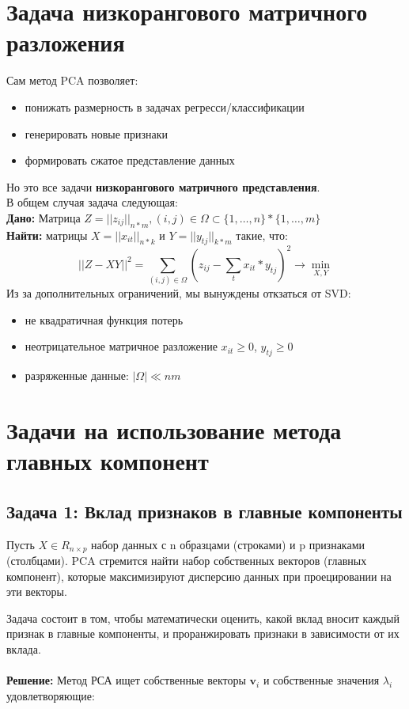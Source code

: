 \section{Задача низкорангового матричного разложения}
Сам метод PCA позволяет:
\begin{itemize}
    \item понижать размерность в задачах регресси/классификации
    \item генерировать новые признаки 
    \item формировать сжатое представление данных
\end{itemize}
Но это все задачи \textbf{низкорангового матричного представления}. \\
В общем случая задача следующая: \\
\textbf{Дано:} Матрица $Z = ||z_{ij}||_{n*m}, (i, j) \in \Omega \subset \{1, \dots, n\}*\{1, \dots, m\}$  \\ 
\textbf{Найти:} матрицы $X=||x_{it}||_{n*k}$ и $Y = ||y_{tj}||_{k*m}$ такие, что:  
$$
||Z-XY||^{2} = \sum_{(i,j) \in \Omega} (z_{ij} - \sum_t x_{it}*y_{tj})^2 \rightarrow \min_{X, Y}
$$
Из за дополнительных ограничений, мы вынуждены откзаться от SVD:
\begin{itemize}
    \item не квадратичная функция потерь
    \item неотрицательное матричное разложение $x_{it} \geq 0$, $y_{tj} \geq 0$
    \item разряженные данные: $|\Omega| \ll nm$
\end{itemize}

\section{Задачи на использование метода главных компонент}

\subsection{Задача 1: Вклад признаков в главные компоненты}
Пусть $X \in R_{n\times p}$ набор данных с n образцами (строками) и p признаками (столбцами). PCA стремится найти набор собственных векторов (главных компонент), которые максимизируют дисперсию данных при проецировании на эти векторы.

Задача состоит в том, чтобы математически оценить, какой вклад вносит каждый признак в главные компоненты, и проранжировать признаки в зависимости от их вклада.\\ \\
\textbf{Решение:}
Метод РСА ищет собственные векторы $\mathbf{v}_i$ и собственные значения $\lambda_i$ удовлетворяющие:

